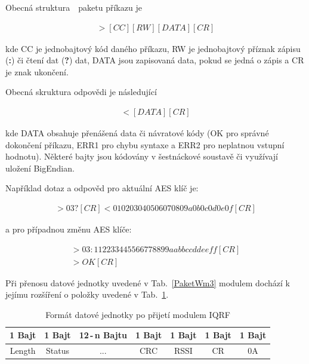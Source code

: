 Obecná struktura~\cite{ModulIQRF}~paketu příkazu je 

\begin{eqnarray}
			>[CC][RW][DATA][CR]
\end{eqnarray}

kde CC je jednobajtový kód daného příkazu, RW je jednobajtový příznak zápisu (\textbf{:}) či čtení dat (\textbf{?}) dat, DATA jsou zapisovaná data, pokud se jedná o zápis a CR je znak ukončení.

Obecná skruktura odpovědi je následující

\begin{eqnarray}
	<[DATA][CR]
\end{eqnarray}

kde DATA obsahuje přenášená data či návratové kódy (OK pro správné dokončení příkazu, ERR1 pro chybu syntaxe a ERR2 pro neplatnou vstupní hodnotu). Některé bajty jsou kódovány v šestnáckové soustavě či využívají uložení BigEndian.

Například dotaz a odpověd pro aktuální AES klíč je:

\begin{eqnarray}
	>03?[CR]
	<010203040506070809a0b0c0d0e0f[CR]
\end{eqnarray}

a pro případnou změnu AES klíče:

\begin{eqnarray}
>03:112233445566778899aabbccddeeff[CR]\\
>OK[CR]
\end{eqnarray}

Při přenosu datové jednotky uvedené v Tab.~\ref{PaketWm3} modulem dochází k jejímu rozšíření o položky uvedené v Tab.~\ref{PaketWm4}.

\begin{table}[!h]
\centering
\begin{tabular}{ccccccc}
1 Bajt & 1 Bajt & 12\,-\,n Bajtu & 1 Bajt & 1 Bajt & 1 Bajt & 1 Bajt\\ \hline
\multicolumn{1}{|c|}{Length} & \multicolumn{1}{c|}{Status} & \multicolumn{1}{c|}{...} & \multicolumn{1}{c|}{CRC} & \multicolumn{1}{c|}{RSSI} & \multicolumn{1}{c|}{CR} & \multicolumn{1}{c|}{0A}\\ \hline
\end{tabular}
\caption{Formát datové jednotky po přijetí modulem IQRF}
\label{PaketWm4}
\end{table}





